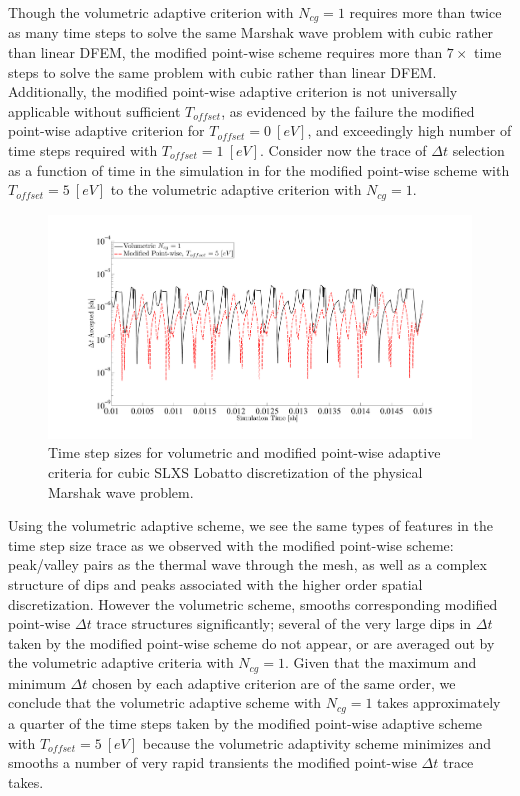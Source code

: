 Though the volumetric adaptive criterion with $N_{cg}=1$  requires more than twice as many time steps to solve the same Marshak wave problem with cubic rather than linear DFEM, the modified point-wise scheme requires more than $7\times$ time steps to solve the same problem with cubic rather than linear DFEM. 
Additionally, the modified point-wise adaptive criterion is not universally applicable without sufficient $T_{offset}$, as evidenced by the failure the modified point-wise adaptive criterion for $T_{offset}=0~[eV]$, and exceedingly high number of time steps required with $T_{offset}=1~[eV]$.
Consider now the trace of $\Delta t$ selection as a function of time in the simulation in  for the modified point-wise scheme with $T_{offset}=5~[eV]$ to the volumetric adaptive criterion with $N_{cg}=1$.
\begin{figure}[!htp]
\centering
\includegraphics[width=16cm,trim=2in  0.4in 0.5in 0.75in,clip=true]{chapter6_grey_radtran/Dissertation_Data/Volumetric_1C_vs_5ev_in_time.pdf}
\caption{Time step sizes for volumetric and modified point-wise adaptive criteria for cubic SLXS Lobatto discretization of the physical Marshak wave problem.}
\label{fig:5ev_1C}
\end{figure}
Using the volumetric adaptive scheme, we see the same types of features in the time step size trace as we observed with the modified point-wise scheme: peak/valley pairs as the thermal wave through the mesh, as well as a complex structure of dips and peaks associated with the higher order spatial discretization.
However the volumetric scheme, smooths corresponding modified point-wise $\Delta t$ trace structures significantly; several of the very large dips in $\Delta t$ taken by the modified point-wise scheme do not appear, or are averaged out by the volumetric adaptive criteria with $N_{cg}=1$.
Given that the maximum and minimum $\Delta t$ chosen by each adaptive criterion are of the same order, we conclude that the volumetric adaptive scheme with $N_{cg}=1$ takes approximately a quarter of the time steps taken by the modified point-wise adaptive scheme with $T_{offset} = 5~[eV]$ because the volumetric adaptivity scheme minimizes and smooths a number of very rapid transients the modified point-wise $\Delta t$ trace takes.

